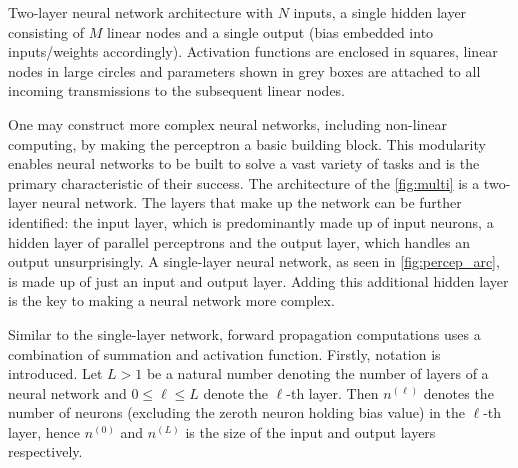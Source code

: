 \begin{bigfig}
    
    \captionsetup{width=\linewidth}
    \caption{Two-layer neural network architecture with $N$ inputs, a single hidden layer consisting of $M$ linear nodes and a single output (bias embedded into inputs/weights accordingly). Activation functions are enclosed in squares, linear nodes in large circles and parameters shown in grey boxes are attached to all incoming transmissions to the subsequent linear nodes.}
    \label{fig:multi}
\end{bigfig}

One may construct more complex neural networks, including non-linear computing, by making the perceptron a basic building block. This modularity enables neural networks to be built to solve a vast variety of tasks and is the primary characteristic of their success. The architecture of the \autoref{fig:multi} is a two-layer neural network. The layers that make up the network can be further identified: the input layer, which is predominantly made up of input neurons, a hidden layer of parallel perceptrons and the output layer, which handles an output unsurprisingly. A single-layer neural network, as seen in \autoref{fig:percep_arc}, is made up of just an input and output layer. Adding this additional hidden layer is the key to making a neural network more complex. 

Similar to the single-layer network, forward propagation computations uses a combination of summation and activation function. Firstly, notation is introduced. Let $L>1$ be a natural number denoting the number of layers of a neural network and $0\leq \ell\leq L$ denote the $\ell$-th layer. Then $n^{(\ell)}$ denotes the number of neurons (excluding the zeroth neuron holding bias value) in the $\ell$-th layer, hence $n^{(0)}$ and $n^{(L)}$ is the size of the input and output layers respectively. 

